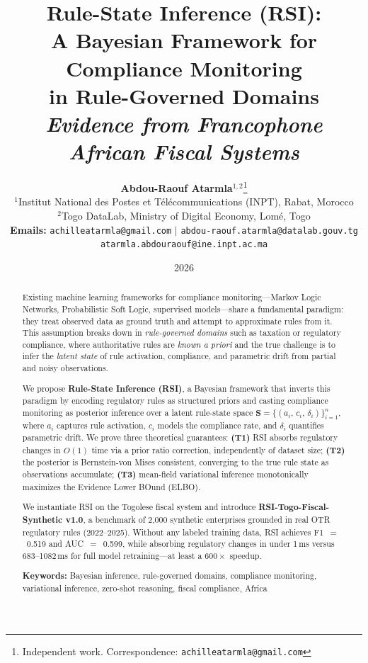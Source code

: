 \documentclass[letterpaper]{article}
\title{%
\textbf{Rule-State Inference (RSI):}\\
\textbf{A Bayesian Framework for Compliance Monitoring}\\
\textbf{in Rule-Governed Domains}\\[0.4em]
\large\textit{Evidence from Francophone African Fiscal Systems}
}
\author{
    \textbf{Abdou-Raouf Atarmla}$^{1,2}$\thanks{Independent work. Correspondence: \texttt{achilleatarmla@gmail.com}} \\
    \small $^{1}$Institut National des Postes et T\'el\'ecommunications (INPT), Rabat, Morocco \\
    \small $^{2}$Togo DataLab, Ministry of Digital Economy, Lom\'e, Togo \\
    \small \textbf{Emails:} \texttt{achilleatarmla@gmail.com} $|$ \texttt{abdou-raouf.atarmla@datalab.gouv.tg} \\
    \small \texttt{atarmla.abdouraouf@ine.inpt.ac.ma}
}
\date{2026}
\begin{document}
\maketitle
\thispagestyle{empty}

\begin{abstract}
\noindent
Existing machine learning frameworks for compliance monitoring---Markov
Logic Networks, Probabilistic Soft Logic, supervised models---share a
fundamental paradigm: they treat observed data as ground truth and
attempt to approximate rules from it. This assumption breaks down in
\emph{rule-governed domains} such as taxation or regulatory compliance,
where authoritative rules are \emph{known a priori} and the true
challenge is to infer the \emph{latent state} of rule activation,
compliance, and parametric drift from partial and noisy observations.

We propose \textbf{Rule-State Inference (RSI)}, a Bayesian framework
that inverts this paradigm by encoding regulatory rules as structured
priors and casting compliance monitoring as posterior inference over a
latent rule-state space $\mathbf{S} = \{(a_i,\, c_i,\, \delta_i)\}_{i=1}^n$,
where $a_i$ captures rule activation, $c_i$ models the compliance rate,
and $\delta_i$ quantifies parametric drift. We prove three theoretical
guarantees:
\textbf{(T1)} RSI absorbs regulatory changes in $O(1)$ time via a
prior ratio correction, independently of dataset size;
\textbf{(T2)} the posterior is Bernstein-von Mises consistent,
converging to the true rule state as observations accumulate;
\textbf{(T3)} mean-field variational inference monotonically maximizes
the Evidence Lower BOund (ELBO).

We instantiate RSI on the Togolese fiscal system and introduce
\textbf{RSI-Togo-Fiscal-Synthetic v1.0}, a benchmark of 2{,}000
synthetic enterprises grounded in real OTR regulatory rules
(2022--2025). Without any labeled training data, RSI achieves
F1~$=$~0.519 and AUC~$=$~0.599, while absorbing regulatory changes
in under 1\,ms versus 683--1082\,ms for full model retraining---at
least a $600\times$ speedup.

\medskip
\noindent\textbf{Keywords:} Bayesian inference, rule-governed domains,
compliance monitoring, variational inference, zero-shot reasoning,
fiscal compliance, Africa
\end{abstract}

\newpage

\end{document}
